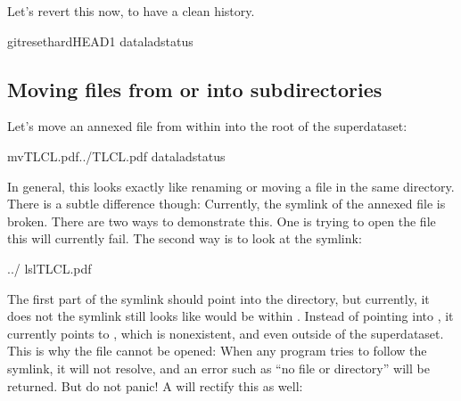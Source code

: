 \sphinxAtStartPar
Let’s revert this now, to have a clean history.

\begin{sphinxVerbatim}[commandchars=\\\{\}]
gitreset\PYGZhy{}\PYGZhy{}hardHEAD\PYGZti{}1
dataladstatus
\end{sphinxVerbatim}


\subsection{Moving files from or into subdirectories}
\label{\detokenize{basics/101-136-filesystem:moving-files-from-or-into-subdirectories}}
\sphinxAtStartPar
Let’s move an annexed file from within  into the root
of the superdataset:

\begin{sphinxVerbatim}[commandchars=\\\{\}]
mvTLCL.pdf../TLCL.pdf
dataladstatus
\end{sphinxVerbatim}

\sphinxAtStartPar
In general, this looks exactly like renaming or moving a file
in the same directory. There is a subtle difference though:
Currently, the symlink of the annexed file is broken. There
are two ways to demonstrate this. One is trying to open the
file \textendash{} this will currently fail. The second way is to look
at the symlink:

\begin{sphinxVerbatim}[commandchars=\\\{\}]
../
ls\PYGZhy{}lTLCL.pdf
\end{sphinxVerbatim}

\sphinxAtStartPar
The first part of the symlink should point into the 
directory, but currently, it does not \textendash{} the symlink still looks
like  would be within . Instead of pointing
into , it currently points to , which is non\sphinxhyphen{}existent,
and even outside of the superdataset. This is why the file
cannot be opened: When any program tries to follow the symlink,
it will not resolve, and an error such as “no file or directory”
will be returned. But do not panic! A  will
rectify this as well:


